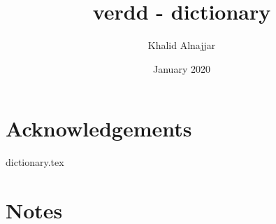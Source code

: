 \documentclass[10pt,a5paper]{verdd}
\title{verdd - dictionary}
\author{Khalid Alnajjar}
\date{January 2020}
\begin{document}


\section*{Acknowledgements}
\lipsum[1-8]

\newpage

\dictionarystyle
{dictionary.tex}

\newpage
{}
\section*{Notes}
\lipsum[1-5]
\end{document}

